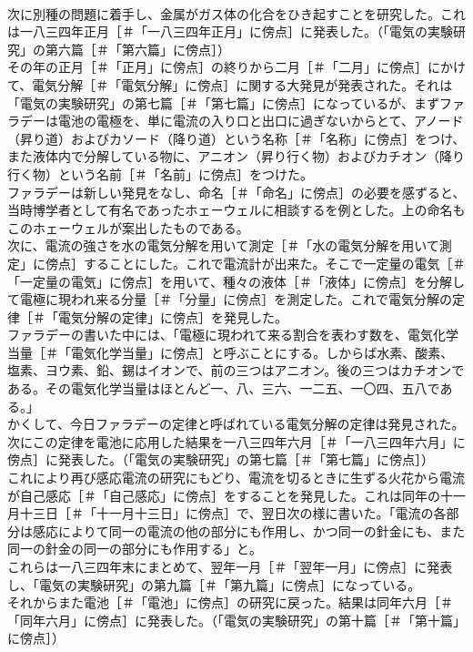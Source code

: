 \documentclass[8pt]{extreport}
\begin{document}
\begin{CJK}{UTF8}{min}
\\	次に別種の問題に着手し、金属がガス体の化合をひき起すことを研究した。これは一八三四年正月［＃「一八三四年正月」に傍点］に発表した。（「電気の実験研究」の第六篇［＃「第六篇」に傍点］）
\\	その年の正月［＃「正月」に傍点］の終りから二月［＃「二月」に傍点］にかけて、電気分解［＃「電気分解」に傍点］に関する大発見が発表された。それは「電気の実験研究」の第七篇［＃「第七篇」に傍点］になっているが、まずファラデーは電池の電極を、単に電流の入り口と出口に過ぎないからとて、アノード（昇り道）およびカソード（降り道）という名称［＃「名称」に傍点］をつけ、また液体内で分解している物に、アニオン（昇り行く物）およびカチオン（降り行く物）という名前［＃「名前」に傍点］をつけた。
\\	ファラデーは新しい発見をなし、命名［＃「命名」に傍点］の必要を感ずると、当時博学者として有名であったホェーウェルに相談するを例とした。上の命名もこのホェーウェルが案出したものである。
\\	次に、電流の強さを水の電気分解を用いて測定［＃「水の電気分解を用いて測定」に傍点］することにした。これで電流計が出来た。そこで一定量の電気［＃「一定量の電気」に傍点］を用いて、種々の液体［＃「液体」に傍点］を分解して電極に現われ来る分量［＃「分量」に傍点］を測定した。これで電気分解の定律［＃「電気分解の定律」に傍点］を発見した。
\\	ファラデーの書いた中には、「電極に現われて来る割合を表わす数を、電気化学当量［＃「電気化学当量」に傍点］と呼ぶことにする。しからば水素、酸素、塩素、ヨウ素、鉛、錫はイオンで、前の三つはアニオン。後の三つはカチオンである。その電気化学当量はほとんど一、八、三六、一二五、一〇四、五八である。」
\\	かくして、今日ファラデーの定律と呼ばれている電気分解の定律は発見された。
\\	次にこの定律を電池に応用した結果を一八三四年六月［＃「一八三四年六月」に傍点］に発表した。（「電気の実験研究」の第七篇［＃「第七篇」に傍点］）
\\	これにより再び感応電流の研究にもどり、電流を切るときに生ずる火花から電流が自己感応［＃「自己感応」に傍点］をすることを発見した。これは同年の十一月十三日［＃「十一月十三日」に傍点］で、翌日次の様に書いた。「電流の各部分は感応によりて同一の電流の他の部分にも作用し、かつ同一の針金にも、また同一の針金の同一の部分にも作用する」と。
\\	これらは一八三四年末にまとめて、翌年一月［＃「翌年一月」に傍点］に発表し、「電気の実験研究」の第九篇［＃「第九篇」に傍点］になっている。
\\	それからまた電池［＃「電池」に傍点］の研究に戻った。結果は同年六月［＃「同年六月」に傍点］に発表した。（「電気の実験研究」の第十篇［＃「第十篇」に傍点］）

\end{CJK}
\end{document}
